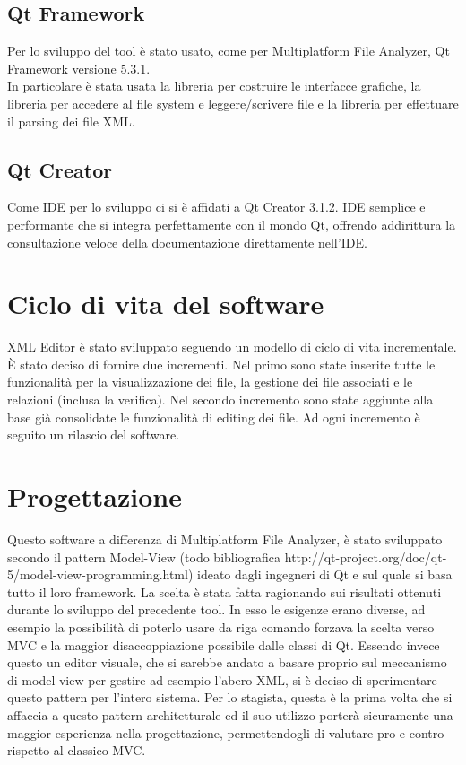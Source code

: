 	\subsection{Qt Framework}
		Per lo sviluppo del tool è stato usato, come per Multiplatform File Analyzer, Qt Framework versione 5.3.1.\\
		In particolare è stata usata la libreria per costruire le interfacce grafiche, la libreria per accedere al file system e leggere/scrivere file e la libreria per effettuare il parsing dei file XML.
	
	\subsection{Qt Creator}
		Come IDE per lo sviluppo ci si è affidati a Qt Creator 3.1.2. IDE semplice e performante che si integra perfettamente con il mondo Qt, offrendo addirittura la consultazione veloce della documentazione direttamente nell'IDE.
	
	\section{Ciclo di vita del software}
		XML Editor è stato sviluppato seguendo un modello di ciclo di vita incrementale. È stato deciso di fornire due incrementi. Nel primo sono state inserite tutte le funzionalità per la visualizzazione dei file, la gestione dei file associati e le relazioni (inclusa la verifica). Nel secondo incremento sono state aggiunte alla base già consolidate le funzionalità di editing dei file. Ad ogni incremento è seguito un rilascio del software.

\section{Progettazione}
	Questo software a differenza di Multiplatform File Analyzer, è stato sviluppato secondo il pattern Model-View (todo bibliografica http://qt-project.org/doc/qt-5/model-view-programming.html) ideato dagli ingegneri di Qt e sul quale si basa tutto il loro framework. La scelta è stata fatta ragionando sui risultati ottenuti durante lo sviluppo del precedente tool. In esso le esigenze erano diverse, ad esempio la possibilità di poterlo usare da riga comando forzava la scelta verso MVC e la maggior disaccoppiazione possibile dalle classi di Qt. Essendo invece questo un editor visuale, che si sarebbe andato a basare proprio sul meccanismo di model-view per gestire ad esempio l'abero XML, si è deciso di sperimentare questo pattern per l'intero sistema. Per lo stagista, questa è la prima volta che si affaccia a questo pattern architetturale ed il suo utilizzo porterà sicuramente una maggior esperienza nella progettazione, permettendogli di valutare pro e contro rispetto al classico MVC.

